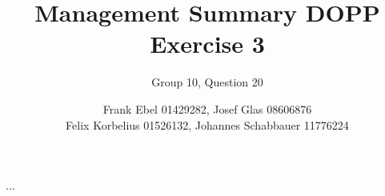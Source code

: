 \documentclass[a4paper,10pt]{scrartcl}
\author{Frank Ebel 01429282, Josef Glas 08606876\\Felix Korbelius 01526132, Johannes Schabbauer 11776224}
\title{\vspace*{-1cm}Management Summary DOPP Exercise 3}
\subtitle{Group 10, Question 20}
\date{}
\begin{document}
\maketitle

...
\end{document}
